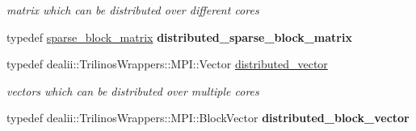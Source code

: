 \begin{DoxyCompactItemize}
\begin{DoxyCompactList}\small\item\em matrix which can be distributed over different cores \item\end{DoxyCompactList}\item 
\hypertarget{namespacenatrium_a70f1738fc69761e34e1df08e0708d2f3}{
typedef \hyperlink{namespacenatrium_acd63e25d68fdb74dd9b789bb2e836cb8}{sparse\_\-block\_\-matrix} {\bfseries distributed\_\-sparse\_\-block\_\-matrix}}
\label{namespacenatrium_a70f1738fc69761e34e1df08e0708d2f3}

\item 
\hypertarget{namespacenatrium_a903d2b92917f582f2ff05f52160ab811}{
typedef dealii::TrilinosWrappers::MPI::Vector \hyperlink{namespacenatrium_a903d2b92917f582f2ff05f52160ab811}{distributed\_\-vector}}
\label{namespacenatrium_a903d2b92917f582f2ff05f52160ab811}

\begin{DoxyCompactList}\small\item\em vectors which can be distributed over multiple cores \item\end{DoxyCompactList}\item 
\hypertarget{namespacenatrium_ac1e32e729ff6f86147e9b109bbe41b48}{
typedef dealii::TrilinosWrappers::MPI::BlockVector {\bfseries distributed\_\-block\_\-vector}}
\label{namespacenatrium_ac1e32e729ff6f86147e9b109bbe41b48}

\end{DoxyCompactItemize}
